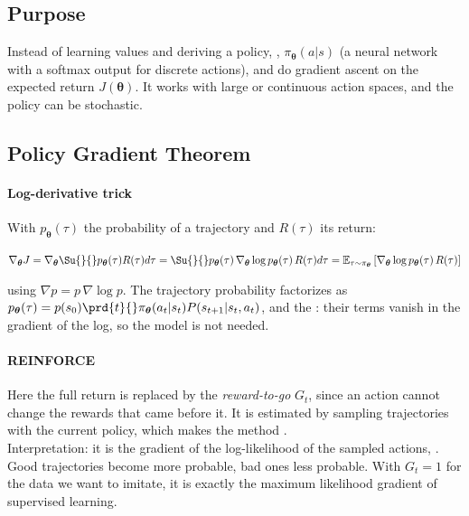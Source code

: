 \subsection{Purpose}
Instead of learning values and deriving a policy, ,
$\pi_{\bm{\theta}}(a|s)$ (a neural network with a softmax output for discrete actions), and
do gradient ascent on the expected return $J(\bm{\theta})$. It works with large or
continuous action spaces, and the policy can be stochastic.

\subsection{Policy Gradient Theorem}
\paragraph{Log-derivative trick}
With $p_{\bm{\theta}}(\tau)$ the probability of a trajectory and $R(\tau)$ its return:
\begin{center}
    $\nabla_{\bm{\theta}}J=\nabla_{\bm{\theta}}\Su{}{}p_{\bm{\theta}}(\tau)R(\tau)d\tau
    =\Su{}{}p_{\bm{\theta}}(\tau)\,\nabla_{\bm{\theta}}\log p_{\bm{\theta}}(\tau)\,
    R(\tau)d\tau=\mathbb{E}_{\tau\sim\pi_{\bm{\theta}}}\left[\nabla_{\bm{\theta}}\log
    p_{\bm{\theta}}(\tau)\,R(\tau)\right]$
\end{center}
using $\nabla p=p\,\nabla\log p$. The trajectory probability factorizes as
$p_{\bm{\theta}}(\tau)=p(s_{0})\prd{t}{}\pi_{\bm{\theta}}(a_{t}|s_{t})P(s_{t+1}|s_{t},a_{t})$,
and the : their terms vanish in the
gradient of the log, so the model is not needed.

\paragraph{REINFORCE}
\begin{center}
\end{center}
Here the full return is replaced by the \emph{reward-to-go} $G_{t}$, since an action cannot
change the rewards that came before it. It is estimated by sampling trajectories with the
current policy, which makes the method .\\
Interpretation: it is the gradient of the log-likelihood of the sampled actions, . Good trajectories become more probable, bad ones less probable. With
$G_{t}=1$ for the data we want to imitate, it is exactly the maximum likelihood gradient of
supervised learning.


